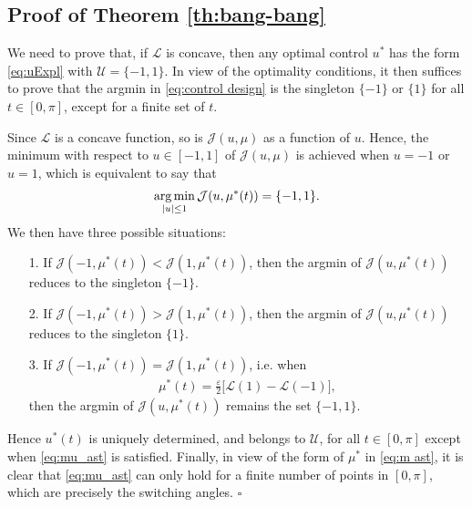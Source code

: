 \documentclass[twocolumn]{autart}    %
\begin{document}
\subsection{Proof of Theorem \ref{th:bang-bang}}\label{proof:bang-bang}

We need to prove that, if $\mathcal{L}$ is concave, then any optimal control $u^\ast$ has the form \eqref{eq:uExpl} with $\mathcal{U}=\{-1,1\}$. In view of the optimality conditions, it then suffices to prove that the argmin in \eqref{eq:control design} is the singleton $\{-1\}$ or $\{1\}$ for all $t\in [0,\pi]$, except for a finite set of $t$.

Since $\mathcal{L}$ is a concave function, so is $\mathcal{J}(u,\mu)$ as a function of $u$. Hence, the minimum with respect to $u\in[-1,1]$ of $\mathcal{J}(u,\mu)$ is achieved when $u=-1$ or $u=1$, which is equivalent to say that 
\begin{align*}
	\operatorname*{arg\,min}_{|u|\leq 1}  \mathcal{J} (u,\mu^\ast(t)) = \{-1,1\}.
\end{align*}
We then have three possible situations:
\begin{itemize}
	\item[1.] If $\mathcal{J}(-1,\mu^\ast(t)) <  \mathcal{J}(1,\mu^\ast(t))$, then the argmin of $\mathcal{J} (u,\mu^\ast(t))$ reduces to the singleton $\{-1\}$.
	\vspace{0.2cm}
	\item[2.] If $\mathcal{J}(-1,\mu^\ast(t)) >  \mathcal{J}(1,\mu^\ast(t))$, then the argmin of $\mathcal{J} (u,\mu^\ast(t))$ reduces to the singleton $\{1\}$.
	\vspace{0.2cm}
	\item[3.] If $\mathcal{J}(-1,\mu^\ast(t)) =  \mathcal{J}(1,\mu^\ast(t))$, i.e. when 
	\begin{align}\label{eq:mu_ast}
		\mu^\ast (t) = \frac{\varepsilon}{2} \Big[\mathcal{L}(1) - \mathcal{L}(-1)\Big],
	\end{align}
	then the argmin of $\mathcal{J} (u,\mu^\ast(t))$ remains the set $\{-1,1\}$.
\end{itemize}
Hence $u^\ast(t)$ is uniquely determined, and belongs to $\mathcal{U}$, for all $t\in [0,\pi]$ except when \eqref{eq:mu_ast} is satisfied. Finally, in view of the form of $\mu^\ast$ in \eqref{eq:m ast}, it is clear that \eqref{eq:mu_ast} can only hold for a finite number of points in $[0,\pi]$, which are precisely the switching angles. \hfill $\square$
\end{document}
